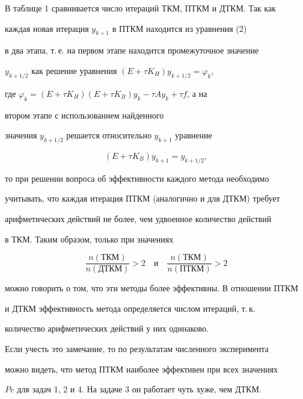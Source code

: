 \begin{notenonum} 


В таблице 1 сравнивается число итераций ТКМ, ПТКМ и ДТКМ. Так как 


каждая новая итерация $y_{k+1}$ в ПТКМ находится из уравнения (2) 


в два этапа, т.\,е. на первом этапе находится промежуточное значение 


$y_{k+1/2}$ как решение уравнения $(E+\tau K_H)y_{k+1/2}=\varphi_k$, 


где $\varphi_k=(E+\tau K_H)(E+\tau K_B)y_k-\tau A y_k+\tau f$, а на 


втором этапе с использованием найденного 


значения $y_{k+1/2}$ решается относительно $y_{k+1}$ уравнение 


$$ 


(E+\tau K_B)y_{k+1}=y_{k+1/2}, 


$$ 


то при решении вопроса об эффективности каждого метода необходимо 


учитывать, что каждая итерация ПТКМ (аналогично и для ДТКМ) требует 


арифметических действий не более, чем удвоенное количество действий 


в ТКМ. Таким образом, только при значениях 


$$ 


\frac{n(\text{ТКМ})}{n(\text{ДТКМ})}>2 \quad \text{и}\quad 


\frac{n(\text{ТКМ})}{n(\text{ПТКМ})}>2 


$$ 


можно говорить о том, что эти методы более эффективны. В отношении ПТКМ 


и ДТКМ эффективность метода определяется числом итераций, т.\,к. 


количество арифметических действий у них одинаково. 


\end{notenonum} 


 


Если учесть это замечание, то по результатам численного эксперимента 


можно видеть, что метод ПТКМ наиболее эффективен при всех значениях 


$Pe$ для задач 1, 2 и 4. На задаче 3 он работает чуть хуже, чем ДТКМ. 


 


